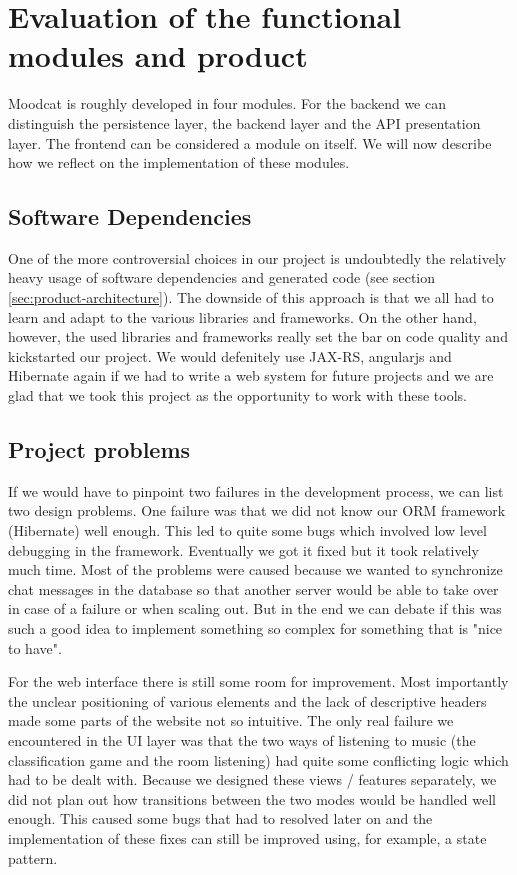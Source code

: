 
\chapter{Evaluation of the functional modules and product}

Moodcat is roughly developed in four modules.
For the backend we can distinguish the persistence layer, the backend layer and the API presentation layer.
The frontend can be considered a module on itself.
We will now describe how we reflect on the implementation of these modules.

\section{Software Dependencies}
One of the more controversial choices in our project is undoubtedly the relatively heavy usage of software dependencies and generated code (see section \ref{sec:product-architecture}).
The downside of this approach is that we all had to learn and adapt to the various libraries and frameworks.
On the other hand, however, the used libraries and frameworks really set the bar on code quality and kickstarted our project.
We would defenitely use JAX-RS, \gls{angularjs} and Hibernate again if we had to write a web system for future projects and we are glad that we took this project as the opportunity to work with these tools.

\section{Project problems}
If we would have to pinpoint two failures in the development process, we can list two design problems.
One failure was that we did not know our ORM framework (Hibernate) well enough.
This led to quite some bugs which involved low level debugging in the framework.
Eventually we got it fixed but it took relatively much time.
Most of the problems were caused because we wanted to synchronize chat messages in the database so that another server would be able to take over in case of a failure or when scaling out.
But in the end we can debate if this was such a good idea to implement something so complex for something that is "nice to have".

For the web interface there is still some room for improvement.
Most importantly the unclear positioning of various elements and the lack of descriptive headers made some parts of the website not so intuitive.
The only real failure we encountered in the UI layer was that the two ways of listening to music (the classification game and the room listening) had quite some conflicting logic which had to be dealt with.
Because we designed these views / features separately, we did not plan out how transitions between the two modes would be handled well enough.
This caused some bugs that had to resolved later on and the implementation of these fixes can still be improved using, for example, a state pattern.

